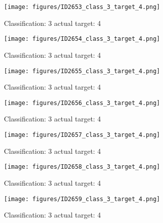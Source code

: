 \begin{figure}[h!]
\begin{center}
\texttt{[image: figures/ID2653\_class\_3\_target\_4.png]}
\end{center}
\caption{ Classification: 3 actual target: 4}
\label{fig:ID2653_class_3_target_4}
\end{figure}
\begin{figure}[h!]
\begin{center}
\texttt{[image: figures/ID2654\_class\_3\_target\_4.png]}
\end{center}
\caption{ Classification: 3 actual target: 4}
\label{fig:ID2654_class_3_target_4}
\end{figure}
\begin{figure}[h!]
\begin{center}
\texttt{[image: figures/ID2655\_class\_3\_target\_4.png]}
\end{center}
\caption{ Classification: 3 actual target: 4}
\label{fig:ID2655_class_3_target_4}
\end{figure}
\begin{figure}[h!]
\begin{center}
\texttt{[image: figures/ID2656\_class\_3\_target\_4.png]}
\end{center}
\caption{ Classification: 3 actual target: 4}
\label{fig:ID2656_class_3_target_4}
\end{figure}
\begin{figure}[h!]
\begin{center}
\texttt{[image: figures/ID2657\_class\_3\_target\_4.png]}
\end{center}
\caption{ Classification: 3 actual target: 4}
\label{fig:ID2657_class_3_target_4}
\end{figure}
\begin{figure}[h!]
\begin{center}
\texttt{[image: figures/ID2658\_class\_3\_target\_4.png]}
\end{center}
\caption{ Classification: 3 actual target: 4}
\label{fig:ID2658_class_3_target_4}
\end{figure}
\begin{figure}[h!]
\begin{center}
\texttt{[image: figures/ID2659\_class\_3\_target\_4.png]}
\end{center}
\caption{ Classification: 3 actual target: 4}
\label{fig:ID2659_class_3_target_4}
\end{figure}
